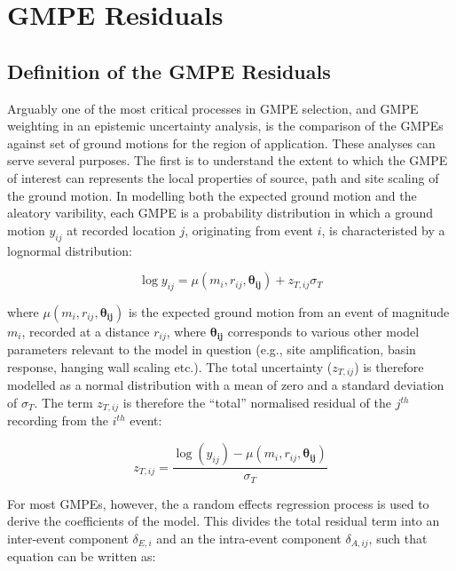 \section{GMPE Residuals}
\label{sec:residuals}

\subsection{Definition of the GMPE Residuals}

Arguably one of the most critical processes in GMPE selection, and GMPE weighting in an epistemic uncertainty analysis, is the comparison of the GMPEs against set of ground motions for the region of application. These analyses can serve several purposes. The first is to understand the extent to which the GMPE of interest can represents the local properties of source, path and site scaling of the ground motion. In modelling both the expected ground motion and the aleatory varibility, each GMPE is a probability distribution in which a ground motion $y_{ij}$ at recorded location $j$, originating from event $i$, is characteristed by a lognormal distribution:

\begin{equation}
\log y_{ij} = \mu \left( {m_i, r_{ij}, \mathbf{\theta_{ij}}} \right) + z_{T, ij}\sigma_T
\label{eq:gmpe_total}
\end{equation}

\noindent where $\mu \left( {m_i, r_{ij}, \mathbf{\theta_{ij}}} \right)$ is the expected ground motion from an event of magnitude $m_i$, recorded at a distance $r_{ij}$, where $\mathbf{\theta_{ij}}$ corresponds to various other model parameters relevant to the model in question (e.g., site amplification, basin response, hanging wall scaling etc.). The total uncertainty ($z_{T, ij}$) is therefore modelled as a normal distribution with a mean of zero and a standard deviation of $\sigma_T$. The term $z_{T, ij}$ is therefore the ``total'' normalised residual of the $j^{th}$ recording from the $i^{th}$ event:

\begin{equation}
z_{T, ij} = \frac{\log \left( {y_{ij}} \right) - \mu \left( {m_i, r_{ij}, \mathbf{\theta_{ij}}} \right)}{\sigma_T}
\label{eq:total_residual}
\end{equation}

For most GMPEs, however, the a random effects regression process is used to derive the coefficients of the model. This divides the total residual term into an inter-event component $\delta_{E, i}$ and an the intra-event component $\delta_{A, ij}$, such that equation \label{eq:gmpe} can be written as:

